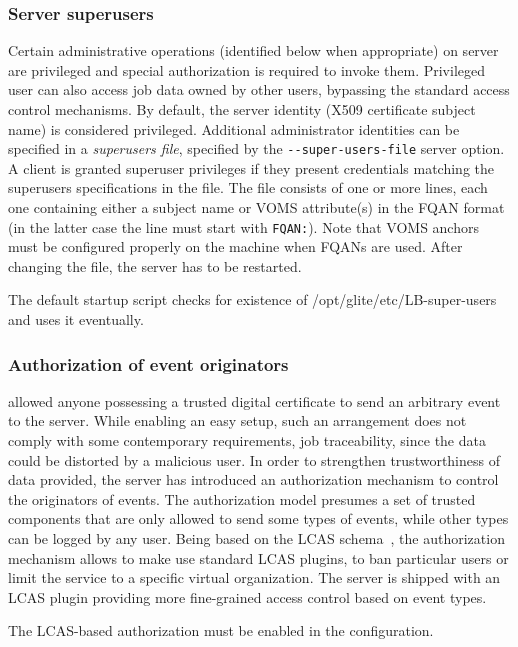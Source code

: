 \subsubsection{Server superusers}
\label{inst:superusers}

Certain administrative operations (identified below when appropriate) on \LB
server are privileged and special authorization is required to invoke them.
Privileged user can also access job data owned by other users, bypassing the
standard \LB access control mechanisms.  By default, the \LB server identity
(X509 certificate subject name) is considered privileged.  Additional
administrator identities can be specified in a \emph{superusers file},
specified by the \verb'--super-users-file' server option.  A client is granted
superuser privileges if they present credentials matching the superusers
specifications in the file.  The file consists of one or more lines, each one
containing either a subject name or VOMS attribute(s) in the FQAN format (in
the latter case the line must start with \verb'FQAN:').  Note that VOMS anchors
must be configured properly on the \LB machine when FQANs are used.  After
changing the file, the server has to be restarted. 

The default startup script checks for existence of 
/opt/glite/etc/LB-super-users and uses it eventually.

\subsubsection{Authorization of event originators}
\LBold allowed anyone possessing a trusted digital certificate to send an
arbitrary event to the \LB server. While enabling an easy setup, such an
arrangement does not comply with some contemporary requirements, \eg job
traceability, since the data could be distorted by a malicious user.  In order
to strengthen trustworthiness of data provided, the \LBnew server has
introduced an authorization mechanism to control the originators of events.
The authorization model presumes a set of trusted components that are only
allowed to send some types of events, while other types can be logged by any
user. Being based on the LCAS schema~\cite{lcas}, the authorization mechanism
allows to make use standard LCAS plugins, \eg to ban particular users or limit
the service to a specific virtual organization. The \LB server is shipped with
an LCAS plugin providing more fine-grained access control based on event types.

The LCAS-based authorization must be enabled in the \LB configuration.


